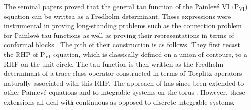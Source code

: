 \documentclass[a4paper,reqno,11pt]{amsart}
\numberwithin{equation}{section}
\numberwithin{figure}{section}
\theoremstyle{plain}
\theoremstyle{remark}
\newcommand\Psix{\textrm{P}_{\textrm{VI}}}
\numberwithin{rhp}{section}
\begin{document}
The seminal papers \cite{gavrylenko2018fredholm, CGL2017} proved that the general tau function of the Painlev\'e VI ($\Psix$) equation can be written as a Fredholm determinant.
These expressions were instrumental in proving long-standing problems such as the connection problem for Painlev\'e tau functions
 as well as proving their representations in terms of conformal blocks \cite{Gamayun2012}. The pith of their construction is as follows. They first recast the RHP of $\Psix$ equation, which is classically defined on a union of contours, to a RHP on the unit circle.
The tau function is then written as the Fredholm determinant of a trace class operator constructed in terms of Toeplitz operators naturally associated with this RHP. 
 The approach of \cite{gavrylenko2018fredholm,CGL2017} has since been extended to other Painlev\'e equations \cite{GavrylenkoLisovyi2017,GIL2018b,GIL2018a,desiraju2019tau,Desiraju2021} and to integrable systems on the torus \cite{DMDG2020,desiraju2022painleve,DMDG2022,delmonte2025modulartransformationstaufunctions}. However, these extensions all deal with continuous as opposed to discrete integrable systems.


\end{document}
